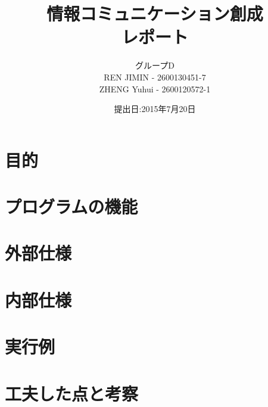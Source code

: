 \documentclass{jarticle}
\title{情報コミュニケーション創成\\レポート}
\author{グループD\\REN JIMIN - 2600130451-7\\ZHENG Yuhui - 2600120572-1}
\date{提出日:2015年7月20日}
\begin{document}
\maketitle
\tableofcontents
\clearpage

\section{目的}
	
\section{プログラムの機能}
	
\section{外部仕様}
	
\section{内部仕様}
	
\section{実行例}
	
\section{工夫した点と考察}
		
\end{document}
